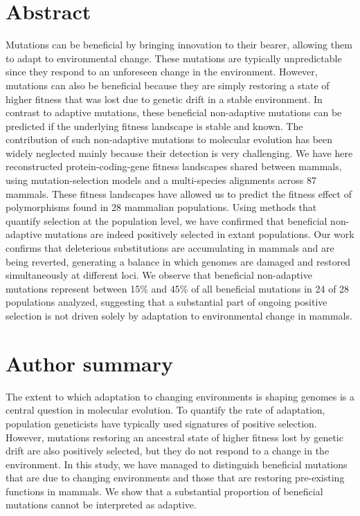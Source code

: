 \documentclass[10pt,letterpaper]{article}
\begin{document}
\section*{Abstract}
Mutations can be beneficial by bringing innovation to their bearer, allowing them to adapt to environmental change.
These mutations are typically unpredictable since they respond to an unforeseen change in the environment.
However, mutations can also be beneficial because they are simply restoring a state of higher fitness that was lost due to genetic drift in a stable environment.
In contrast to adaptive mutations, these beneficial non-adaptive mutations can be predicted if the underlying fitness landscape is stable and known.
The contribution of such non-adaptive mutations to molecular evolution has been widely neglected mainly because their detection is very challenging.
We have here reconstructed protein-coding-gene fitness landscapes shared between mammals, using mutation-selection models and a multi-species alignments across 87 mammals.
These fitness landscapes have allowed us to predict the fitness effect of polymorphisms found in 28 mammalian populations.
Using methods that quantify selection at the population level, we have confirmed that beneficial non-adaptive mutations are indeed positively selected in extant populations.
Our work confirms that deleterious substitutions are accumulating in mammals and are being reverted, generating a balance in which genomes are damaged and restored simultaneously at different loci.
We observe that beneficial non-adaptive mutations represent between 15\% and 45\% of all beneficial mutations in 24 of 28 populations analyzed, suggesting that a substantial part of ongoing positive selection is not driven solely by adaptation to environmental change in mammals.


\section*{Author summary}
The extent to which adaptation to changing environments is shaping genomes is a central question in molecular evolution.
To quantify the rate of adaptation, population geneticists have typically used signatures of positive selection.
However, mutations restoring an ancestral state of higher fitness lost by genetic drift are also positively selected, but they do not respond to a change in the environment.
In this study, we have managed to distinguish beneficial mutations that are due to changing environments and those that are restoring pre-existing functions in mammals.
We show that a substantial proportion of beneficial mutations cannot be interpreted as adaptive.
\end{document}
